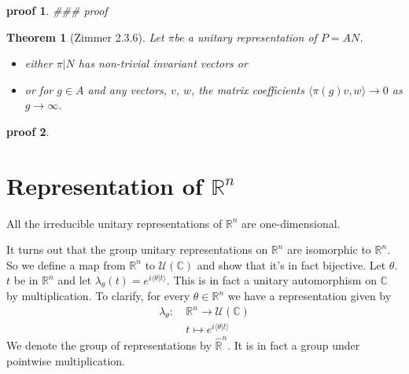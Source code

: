 \documentclass[
]{article}
\theoremstyle{break}
\newtheorem{thm}{Theorem}
\theoremstyle{plain}
\newtheorem*{pf}{proof}
\newcommand{\mpi}{\ensuremath{\pi}}
\newcommand{\bbr}{\ensuremath{\mathbb{R}}}
\begin{document}
\begin{pf}
   \#\#\# proof 
\end{pf}

\begin{thm}[Zimmer 2.3.6]
\label{thm:2.3.6}
  Let \mpi be  a unitary representation of $P = AN$.
  \begin{itemize}
    \item either $\pi|N$ has non-trivial invariant vectors or
    \item or for $g \in A$ and any vectors, $v$, $w$, the matrix coefficients
      $\langle \pi(g)v, w \rangle \rightarrow 0$ as $g \rightarrow \infty$.
  \end{itemize}
\end{thm}

\begin{pf}
\end{pf}


\hypertarget{representation-of-rn}{%
\section{Representation of \texorpdfstring{$\bbr^n$}{R\^{}n}}\label{representation-of-rn}}


All the irreducible unitary
representations of $\mathbb{R}^n$ are one-dimensional.

It turns out that the group unitary representations on $\mathbb{R}^n$
are isomorphic to $\mathbb{R}^n$. So we define a map from
$\mathbb{R}^n$ to $\mathcal{U}(\mathbb{C})$ and show that it's in
fact bijective. Let $\theta$. $t$ be in $\mathbb{R}^n$ and let
$\lambda_{\theta}(t) = e^{i\langle \theta | t \rangle}$. This is in
fact a unitary automorphism on $\mathbb{C}$ by multiplication. To
clarify, for every $\theta \in \mathbb{R}^n$ we have a representation
given by
  \begin{align*}
  \lambda_{\theta}:\ & \mathbb{R}^n \rightarrow \mathcal{U}(\mathbb{C}) \\
  & t \mapsto e^{i \langle \theta | t \rangle}
  \end{align*}
We denote the group of representations by $\hat{\mathbb{R}}^n$. It
is in fact a group under pointwise multiplication.


\end{document}
